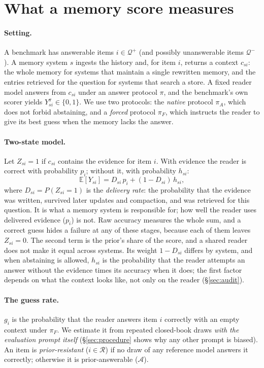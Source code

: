 \section{What a memory score measures}
\label{sec:formulation}

\paragraph{Setting.} A benchmark has answerable items $i\in\mathcal{Q}^+$ (and possibly unanswerable items
$\mathcal{Q}^-$). A memory system $s$ ingests the history and, for item $i$, returns a context $c_{si}$: the whole memory for systems
that maintain a single rewritten memory, and the entries retrieved for the question for systems that search a store. A fixed reader
model answers from $c_{si}$ under an answer protocol $\pi$, and the benchmark's own scorer yields $Y^\pi_{si}\in\{0,1\}$.
We use two protocols: the \emph{native} protocol $\pi_A$, which does not forbid abstaining, and a \emph{forced}
protocol $\pi_F$, which instructs the reader to give its best guess when the memory lacks the answer.

\paragraph{Two-state model.} Let $Z_{si}=1$ if $c_{si}$ contains the evidence for item $i$. With evidence the reader is
correct with probability $p_i$; without it, with probability $h_{si}$:
\begin{equation}
\mathbb{E}[Y_{si}] = D_{si}\,p_i + (1-D_{si})\,h_{si},
\end{equation}
where $D_{si}=P(Z_{si}=1)$ is the \emph{delivery rate}: the probability that the evidence was written, survived later
updates and compaction, and was retrieved for this question. It is what a memory system is responsible for; how well the
reader uses delivered evidence ($p_i$) is not. Raw accuracy measures the whole sum, and a correct guess hides a failure at
any of these stages, because each of them leaves $Z_{si}=0$. The second term is the prior's share of the score, and a
shared reader does not make it equal across systems. Its weight $1-D_{si}$ differs by system, and when abstaining is
allowed, $h_{si}$ is the probability that the reader attempts an answer without the evidence times its accuracy when it
does; the first factor depends on what the context looks like, not only on the reader (\S\ref{sec:audit}).

\paragraph{The guess rate.} $g_i$ is the probability that the reader answers item $i$ correctly with an empty context
under $\pi_F$. We estimate it from repeated closed-book draws \emph{with the evaluation prompt itself}
(\S\ref{sec:procedure} shows why any other prompt is biased). An item is \emph{prior-resistant} ($i\in\mathcal{R}$) if
no draw of any reference model answers it correctly; otherwise it is prior-answerable ($\mathcal{A}$).

